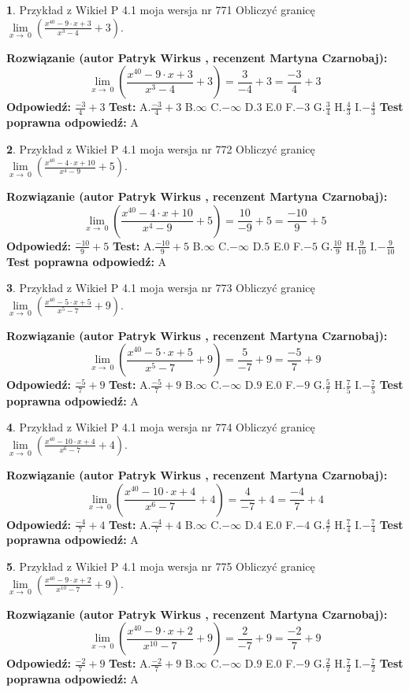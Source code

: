 \documentclass[12pt, a4paper]{article}
\theoremstyle{definition} %
\newtheorem{zad}{}
\newcommand{\zadStart}[1]{\begin{zad}#1\newline}
\newcommand{\zadStop}{\end{zad}}
\newcommand{\rozwStart}[2]{\noindent \textbf{Rozwiązanie (autor #1 , recenzent #2): }\newline}
\newcommand{\rozwStop}{\newline}
\newcommand{\odpStart}{\noindent \textbf{Odpowiedź:}\newline}
\newcommand{\odpStop}{\newline}
\newcommand{\testStart}{\noindent \textbf{Test:}\newline}
\newcommand{\testStop}{\newline}
\newcommand{\kluczStart}{\noindent \textbf{Test poprawna odpowiedź:}\newline}
\newcommand{\kluczStop}{\newline}
\begin{document}
\zadStart{Przykład z Wikieł P 4.1 moja wersja nr 771}
Obliczyć granicę $\lim\limits_{x\to\ 0}(\frac{x^{40}-9 \cdot x +3}{x^{3}-4}+3)$.
\zadStop
\rozwStart{Patryk Wirkus}{Martyna Czarnobaj}
$$\lim\limits_{x\to\ 0}(\frac{x^{40}-9 \cdot x +3}{x^{3}-4}+3)=\frac{3}{-4}+3=\frac{-3}{4}+3$$
\rozwStop
\odpStart
$\frac{-3}{4}+3$
\odpStop
\testStart
A.$\frac{-3}{4}+3$
B.$\infty$
C.$-\infty$
D.$3$
E.$0$
F.$-3$
G.$\frac{3}{4}$
H.$\frac{4}{3}$
I.$-\frac{4}{3}$
\testStop
\kluczStart
A
\kluczStop



\zadStart{Przykład z Wikieł P 4.1 moja wersja nr 772}
Obliczyć granicę $\lim\limits_{x\to\ 0}(\frac{x^{40}-4 \cdot x +10}{x^{4}-9}+5)$.
\zadStop
\rozwStart{Patryk Wirkus}{Martyna Czarnobaj}
$$\lim\limits_{x\to\ 0}(\frac{x^{40}-4 \cdot x +10}{x^{4}-9}+5)=\frac{10}{-9}+5=\frac{-10}{9}+5$$
\rozwStop
\odpStart
$\frac{-10}{9}+5$
\odpStop
\testStart
A.$\frac{-10}{9}+5$
B.$\infty$
C.$-\infty$
D.$5$
E.$0$
F.$-5$
G.$\frac{10}{9}$
H.$\frac{9}{10}$
I.$-\frac{9}{10}$
\testStop
\kluczStart
A
\kluczStop



\zadStart{Przykład z Wikieł P 4.1 moja wersja nr 773}
Obliczyć granicę $\lim\limits_{x\to\ 0}(\frac{x^{40}-5 \cdot x +5}{x^{5}-7}+9)$.
\zadStop
\rozwStart{Patryk Wirkus}{Martyna Czarnobaj}
$$\lim\limits_{x\to\ 0}(\frac{x^{40}-5 \cdot x +5}{x^{5}-7}+9)=\frac{5}{-7}+9=\frac{-5}{7}+9$$
\rozwStop
\odpStart
$\frac{-5}{7}+9$
\odpStop
\testStart
A.$\frac{-5}{7}+9$
B.$\infty$
C.$-\infty$
D.$9$
E.$0$
F.$-9$
G.$\frac{5}{7}$
H.$\frac{7}{5}$
I.$-\frac{7}{5}$
\testStop
\kluczStart
A
\kluczStop



\zadStart{Przykład z Wikieł P 4.1 moja wersja nr 774}
Obliczyć granicę $\lim\limits_{x\to\ 0}(\frac{x^{40}-10 \cdot x +4}{x^{6}-7}+4)$.
\zadStop
\rozwStart{Patryk Wirkus}{Martyna Czarnobaj}
$$\lim\limits_{x\to\ 0}(\frac{x^{40}-10 \cdot x +4}{x^{6}-7}+4)=\frac{4}{-7}+4=\frac{-4}{7}+4$$
\rozwStop
\odpStart
$\frac{-4}{7}+4$
\odpStop
\testStart
A.$\frac{-4}{7}+4$
B.$\infty$
C.$-\infty$
D.$4$
E.$0$
F.$-4$
G.$\frac{4}{7}$
H.$\frac{7}{4}$
I.$-\frac{7}{4}$
\testStop
\kluczStart
A
\kluczStop



\zadStart{Przykład z Wikieł P 4.1 moja wersja nr 775}
Obliczyć granicę $\lim\limits_{x\to\ 0}(\frac{x^{40}-9 \cdot x +2}{x^{10}-7}+9)$.
\zadStop
\rozwStart{Patryk Wirkus}{Martyna Czarnobaj}
$$\lim\limits_{x\to\ 0}(\frac{x^{40}-9 \cdot x +2}{x^{10}-7}+9)=\frac{2}{-7}+9=\frac{-2}{7}+9$$
\rozwStop
\odpStart
$\frac{-2}{7}+9$
\odpStop
\testStart
A.$\frac{-2}{7}+9$
B.$\infty$
C.$-\infty$
D.$9$
E.$0$
F.$-9$
G.$\frac{2}{7}$
H.$\frac{7}{2}$
I.$-\frac{7}{2}$
\testStop
\kluczStart
A
\kluczStop
\end{document}
